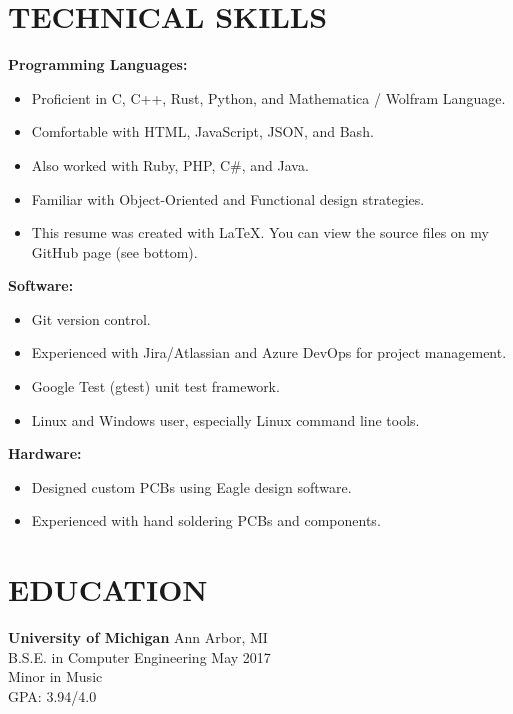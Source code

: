 \documentclass[margin,11pt]{res}
\begin{document}
\begin{resume}
\section{TECHNICAL SKILLS}
\textbf{Programming Languages:}\\
\vspace{-10pt}
\begin{itemize}
    \itemsep -2pt
    \item Proficient in C, C++, Rust, Python, and Mathematica / Wolfram Language.
    \item Comfortable with HTML, JavaScript, JSON, and Bash.
    \item Also worked with Ruby, PHP, C\#, and Java.
    \item Familiar with Object-Oriented and Functional design strategies.
    \item This resume was created with LaTeX.
          You can view the source files on my GitHub page (see bottom).
\end{itemize}

\vspace{-10pt}
\textbf{Software:}
\begin{itemize}
    \itemsep -2pt
    \item Git version control.
    \item Experienced with Jira/Atlassian and Azure DevOps for project management.
    \item Google Test (gtest) unit test framework.
    \item Linux and Windows user, especially Linux command line tools.
\end{itemize}

\vspace{-10pt}
\textbf{Hardware:}
\begin{itemize}
    \itemsep -2pt
    \item Designed custom PCBs using Eagle design software.
    \item Experienced with hand soldering PCBs and components.
\end{itemize}

\vspace{-10pt}
\section{EDUCATION}
\textbf{University of Michigan} \hfill Ann Arbor, MI\\
B.S.E. in Computer Engineering \hfill May 2017\\
Minor in Music\\
GPA: 3.94/4.0\\
\vspace{-24pt}


\end{resume}
\end{document}
